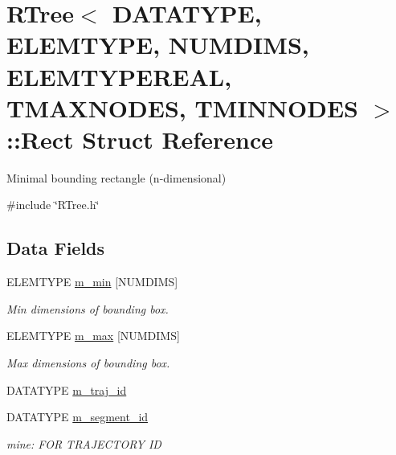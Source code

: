 \hypertarget{structRTree_1_1Rect}{\section{R\-Tree$<$ D\-A\-T\-A\-T\-Y\-P\-E, E\-L\-E\-M\-T\-Y\-P\-E, N\-U\-M\-D\-I\-M\-S, E\-L\-E\-M\-T\-Y\-P\-E\-R\-E\-A\-L, T\-M\-A\-X\-N\-O\-D\-E\-S, T\-M\-I\-N\-N\-O\-D\-E\-S $>$\-:\-:Rect Struct Reference}
\label{structRTree_1_1Rect}
}


Minimal bounding rectangle (n-\/dimensional)  




{\ttfamily \#include \char`\"{}R\-Tree.\-h\char`\"{}}

\subsection*{Data Fields}
\begin{DoxyCompactItemize}
\item 
E\-L\-E\-M\-T\-Y\-P\-E \hyperlink{structRTree_1_1Rect_a2b5b254493aba27b30fe6fc8df151ed5}{m\-\_\-min} \mbox{[}N\-U\-M\-D\-I\-M\-S\mbox{]}
\begin{DoxyCompactList}\small\item\em Min dimensions of bounding box. \end{DoxyCompactList}\item 
E\-L\-E\-M\-T\-Y\-P\-E \hyperlink{structRTree_1_1Rect_a6570c2a5a16b19b0d08cd1eaa224961b}{m\-\_\-max} \mbox{[}N\-U\-M\-D\-I\-M\-S\mbox{]}
\begin{DoxyCompactList}\small\item\em Max dimensions of bounding box. \end{DoxyCompactList}\item 
D\-A\-T\-A\-T\-Y\-P\-E \hyperlink{structRTree_1_1Rect_ae30aa6041e1f115d9f779cc6f127f6f4}{m\-\_\-traj\-\_\-id}
\item 
D\-A\-T\-A\-T\-Y\-P\-E \hyperlink{structRTree_1_1Rect_a36196729bcd01906974001af26423cb7}{m\-\_\-segment\-\_\-id}
\begin{DoxyCompactList}\small\item\em mine\-: F\-O\-R T\-R\-A\-J\-E\-C\-T\-O\-R\-Y I\-D \end{DoxyCompactList}\end{DoxyCompactItemize}


